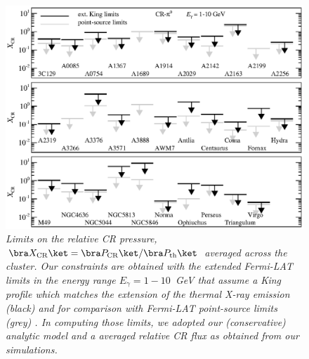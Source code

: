 \documentclass[10pt,aps,pra,reprint,amsmath,amsfonts,amssymb,showpacs,nofootinbib,floatfix]{revtex4-1}
\newcommand{\rmn}{\mathrm}
\begin{document}
\begin{figure}
\begin{minipage}{2.0\columnwidth}
  \includegraphics[width=0.99\columnwidth]{figures/XCR.Fermi.eps}
  \caption{\it Limits on the relative CR pressure, $\bra X_\rmn{CR}\ket = \bra
    P_\rmn{CR} \ket / \bra P_\rmn{th}\ket$ averaged across the cluster. Our
    constraints are obtained with the extended Fermi-LAT limits in the energy
    range $E_\gamma=1-10$~GeV that assume a King profile which matches the
    extension of the thermal X-ray emission (black) and for comparison with
    Fermi-LAT point-source limits (grey) \cite{2010ApJ...717L..71A}. In
    computing those limits, we adopted our (conservative) analytic model
    \cite{2010MNRAS.409..449P} and a averaged relative CR flux as obtained from
    our simulations.}
 \label{fig:XCR}
\end{minipage}
\end{figure}
\end{document}
